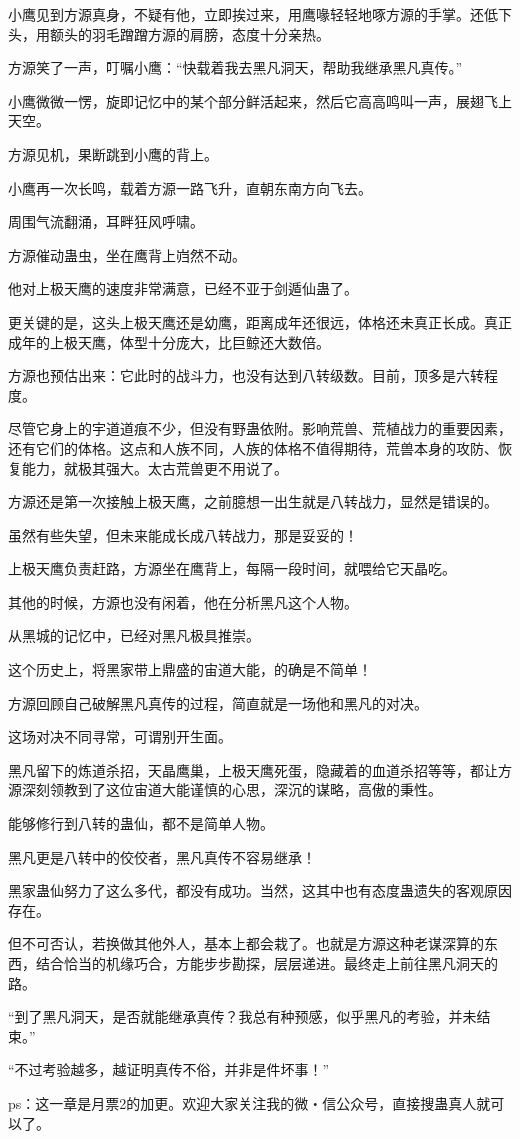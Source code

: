 \begin{this_body}
小鹰见到方源真身，不疑有他，立即挨过来，用鹰喙轻轻地啄方源的手掌。还低下头，用额头的羽毛蹭蹭方源的肩膀，态度十分亲热。

方源笑了一声，叮嘱小鹰：“快载着我去黑凡洞天，帮助我继承黑凡真传。”

小鹰微微一愣，旋即记忆中的某个部分鲜活起来，然后它高高鸣叫一声，展翅飞上天空。

方源见机，果断跳到小鹰的背上。

小鹰再一次长鸣，载着方源一路飞升，直朝东南方向飞去。

周围气流翻涌，耳畔狂风呼啸。

方源催动蛊虫，坐在鹰背上岿然不动。

他对上极天鹰的速度非常满意，已经不亚于剑遁仙蛊了。

更关键的是，这头上极天鹰还是幼鹰，距离成年还很远，体格还未真正长成。真正成年的上极天鹰，体型十分庞大，比巨鲸还大数倍。

方源也预估出来：它此时的战斗力，也没有达到八转级数。目前，顶多是六转程度。

尽管它身上的宇道道痕不少，但没有野蛊依附。影响荒兽、荒植战力的重要因素，还有它们的体格。这点和人族不同，人族的体格不值得期待，荒兽本身的攻防、恢复能力，就极其强大。太古荒兽更不用说了。

方源还是第一次接触上极天鹰，之前臆想一出生就是八转战力，显然是错误的。

虽然有些失望，但未来能成长成八转战力，那是妥妥的！

上极天鹰负责赶路，方源坐在鹰背上，每隔一段时间，就喂给它天晶吃。

其他的时候，方源也没有闲着，他在分析黑凡这个人物。

从黑城的记忆中，已经对黑凡极具推崇。

这个历史上，将黑家带上鼎盛的宙道大能，的确是不简单！

方源回顾自己破解黑凡真传的过程，简直就是一场他和黑凡的对决。

这场对决不同寻常，可谓别开生面。

黑凡留下的炼道杀招，天晶鹰巢，上极天鹰死蛋，隐藏着的血道杀招等等，都让方源深刻领教到了这位宙道大能谨慎的心思，深沉的谋略，高傲的秉性。

能够修行到八转的蛊仙，都不是简单人物。

黑凡更是八转中的佼佼者，黑凡真传不容易继承！

黑家蛊仙努力了这么多代，都没有成功。当然，这其中也有态度蛊遗失的客观原因存在。

但不可否认，若换做其他外人，基本上都会栽了。也就是方源这种老谋深算的东西，结合恰当的机缘巧合，方能步步勘探，层层递进。最终走上前往黑凡洞天的路。

“到了黑凡洞天，是否就能继承真传？我总有种预感，似乎黑凡的考验，并未结束。”

“不过考验越多，越证明真传不俗，并非是件坏事！”

ps：这一章是月票2的加更。欢迎大家关注我的微・信公众号，直接搜蛊真人就可以了。

\end{this_body}


